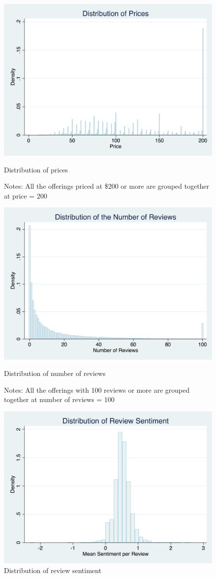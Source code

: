 \begin{figure}\centering
	\includegraphics[width=.8\textwidth]{figures/price_dist-DISC-100}
	\caption{Distribution of prices}
	\caption*{Notes: All the offerings priced at \$200 or more are grouped together at price = 200}
\end{figure}

\begin{figure}\centering
	\includegraphics[width=.8\textwidth]{figures/num_reviews_dist-DISC-100}
	\caption{Distribution of number of reviews}
	\caption*{Notes: All the offerings with 100 reviews or more are grouped together at number of reviews = 100}
\end{figure}

\begin{figure}\centering
	\includegraphics[width=.8\textwidth]{figures/review_sentiment_dist}
	\caption{Distribution of review sentiment}
\end{figure}

